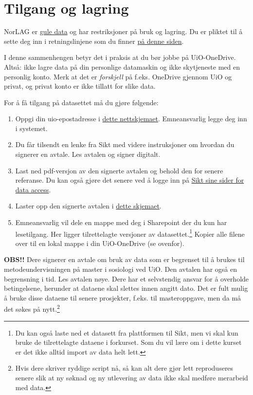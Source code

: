 \documentclass[
  letterpaper,
  DIV=11,
  numbers=noendperiod]{scrreprt}
\providecommand{\tightlist}{%
  \setlength{\itemsep}{0pt}\setlength{\parskip}{0pt}}\usepackage{longtable,booktabs,array}
\theoremstyle{definition}
\theoremstyle{remark}
\begin{document}
\hypertarget{tilgang-og-lagring}{%
\section{Tilgang og lagring}\label{tilgang-og-lagring}}

NorLAG er
\href{https://www.uio.no/tjenester/it/sikkerhet/lsis/tillegg/lagring/infoklasser.html}{gule
data} og har restriksjoner på bruk og lagring. Du er pliktet til å sette
deg inn i retningslinjene som du finner
\href{https://www.uio.no/tjenester/it/sikkerhet/lsis/tillegg/lagringsguide.html}{på
denne siden}.

I denne sammenhengen betyr det i praksis at du bør jobbe på
UiO-OneDrive. Altså: ikke lagre data på din personlige datamaskin og
ikke skytjeneste med en personlig konto. Merk at det er \emph{forskjell}
på f.eks. OneDrive gjennom UiO og privat, og privat konto er ikke
tillatt for slike data.

For å få tilgang på datasettet må du gjøre følgende:

\begin{enumerate}
\def\labelenumi{\arabic{enumi})}
\tightlist
\item
  Oppgi din uio-epostadresse i
  \href{https://nettskjema.no/a/336610}{dette nettskjemaet}.
  Emneansvarlig legge deg inn i systemet.
\item
  Du får tilsendt en lenke fra Sikt med videre instruksjoner om hvordan
  du signerer en avtale. Les avtalen og signer digitalt.
\item
  Last ned pdf-versjon av den signerte avtalen og behold den for senere
  referanse. Du kan også gjøre det senere ved å logge inn på
  \href{https://minside.nsd.no/data-access}{Sikt sine sider for data
  access}.
\item
  Laster opp den signerte avtalen i
  \href{https://nettskjema.no/a/336612}{dette skjemaet}.
\item
  Emneansvarlig vil dele en mappe med deg i Sharepoint der du kun har
  lesetilgang. Her ligger tilrettelagte versjoner av
  datasettet.\footnote{Du kan også laste ned et datasett fra plattformen
    til Sikt, men vi skal kun bruke de tilrettelagte dataene i
    forkurset. Som du vil lære om i dette kurset er det ikke alltid
    import av data helt lett.} Kopier alle filene over til en lokal
  mappe i din UiO-OneDrive (se ovenfor).
\end{enumerate}

\textbf{OBS!!} Dere signerer en avtale om bruk av data som er begrenset
til å brukes til metodeundervisningen på master i sosiologi ved UiO. Den
avtalen har også en begrensning i tid. Les avtalen nøye. Dere har et
selvstendig ansvar for å overholde betingelsene, herunder at dataene
skal slettes innen angitt dato. Det er fult mulig å bruke disse dataene
til senere prosjekter, f.eks. til masteroppgave, men da må det søkes på
nytt.\footnote{Hvis dere skriver ryddige script nå, så kan alt dere gjør
  lett reproduseres senere slik at ny søknad og ny utlevering av data
  ikke skal medføre merarbeid med data.}
\end{document}
